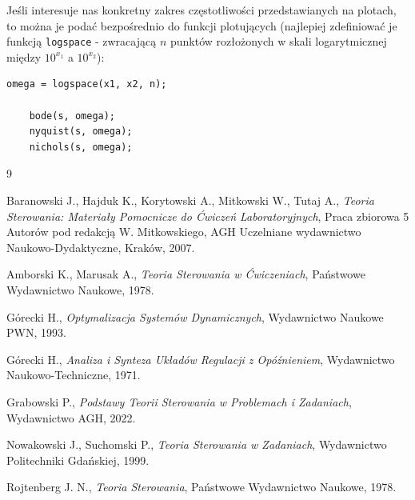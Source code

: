\documentclass{article}
\begin{document}
Jeśli interesuje nas konkretny zakres częstotliwości przedstawianych na plotach, to można je podać bezpośrednio do funkcji plotujących (najlepiej zdefiniować je funkcją \texttt{logspace} - zwracającą $n$ punktów rozłożonych w skali logarytmicznej między $10^{x_1}$ a $10^{x_2}$):
\begin{lstlisting}[style=Matlab-editor]
    omega = logspace(x1, x2, n);
    
    bode(s, omega);
    nyquist(s, omega);
    nichols(s, omega);
\end{lstlisting}

\newpage
\begin{thebibliography}{9}

  Baranowski J., Hajduk K., Korytowski A., Mitkowski W., Tutaj A.,
  \emph{Teoria Sterowania: Materiały Pomocnicze do Ćwiczeń Laboratoryjnych},
  Praca zbiorowa 5 Autorów pod redakcją W. Mitkowskiego,
  AGH Uczelniane wydawnictwo Naukowo-Dydaktyczne,
  Kraków, 2007.

  Amborski K., Marusak A.,
  \emph{Teoria Sterowania w Ćwiczeniach},
  Państwowe Wydawnictwo Naukowe,
  1978.

  Górecki H.,
  \emph{Optymalizacja Systemów Dynamicznych},
  Wydawnictwo Naukowe PWN,
  1993.

  Górecki H.,
  \emph{Analiza i Synteza Układów Regulacji z Opóźnieniem},
  Wydawnictwo Naukowo-Techniczne,
  1971.

  Grabowski P.,
  \emph{Podstawy Teorii Sterowania w Problemach i Zadaniach},
  Wydawnictwo AGH,
  2022.

  Nowakowski J., Suchomski P.,
  \emph{Teoria Sterowania w Zadaniach},
  Wydawnictwo Politechniki Gdańskiej,
  1999.

  Rojtenberg J. N.,
  \emph{Teoria Sterowania},
  Państwowe Wydawnictwo Naukowe,
  1978.

\end{thebibliography}
\end{document}
